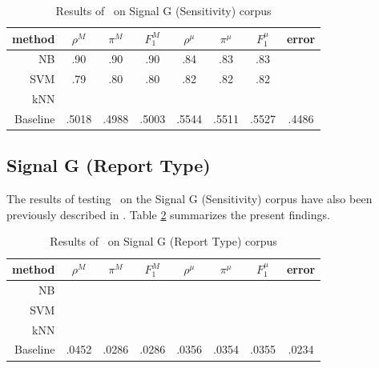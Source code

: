 \begin{table}
\begin{center}
\begin{tabular}{|r c c c c c c c|}
\hline
method    & $\rho^M$ & $\pi^M$ & $F_1^M$ & $\rho^\mu$ & $\pi^\mu$ & $F_1^\mu$ &   error \\
\hline
NB        &   .90    &  .90    &  .90    &  .84       &  .83      &  .83      &         \\
SVM       &   .79    &  .80    &  .80    &  .82       &  .82      &  .82      &         \\
kNN       \\
Baseline  &   .5018  &  .4988  &  .5003  &  .5544     &  .5511    &  .5527    &  .4486  \\
\hline
\end{tabular}
\end{center}
\caption{Results of \aicat\ on Signal G (Sensitivity) corpus}
\label{signalg-sens-results}
\end{table}


\subsection{Signal G (Report Type)}

The results of testing \aicat\ on the Signal G (Sensitivity) corpus
have also been previously described in \cite{calvo:02}.  Table
\ref{signalg-rt-results} summarizes the present findings.

\begin{table}
\begin{center}
\begin{tabular}{|r c c c c c c c|}
\hline
method    & $\rho^M$ & $\pi^M$ & $F_1^M$ & $\rho^\mu$ & $\pi^\mu$ & $F_1^\mu$ &   error \\
\hline
NB        \\
SVM       \\
kNN       \\
Baseline  &   .0452  &  .0286  &  .0286  &  .0356     &  .0354    &  .0355    &  .0234  \\
\hline
\end{tabular}
\end{center}
\caption{Results of \aicat\ on Signal G (Report Type) corpus}
\label{signalg-rt-results}
\end{table}

